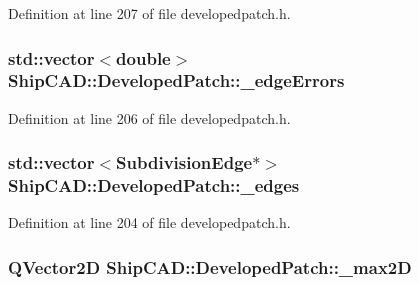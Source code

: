 Definition at line 207 of file developedpatch.\+h.

\subsubsection[{\texorpdfstring{\+\_\+edge\+Errors}{_edgeErrors}}]{\setlength{\rightskip}{0pt plus 5cm}std\+::vector$<$double$>$ Ship\+C\+A\+D\+::\+Developed\+Patch\+::\+\_\+edge\+Errors\hspace{0.3cm}{\ttfamily [protected]}}\hypertarget{classShipCAD_1_1DevelopedPatch_a997ac5cd92f3479d976f79a4da064d42}{}\label{classShipCAD_1_1DevelopedPatch_a997ac5cd92f3479d976f79a4da064d42}


Definition at line 206 of file developedpatch.\+h.

\subsubsection[{\texorpdfstring{\+\_\+edges}{_edges}}]{\setlength{\rightskip}{0pt plus 5cm}std\+::vector$<${\bf Subdivision\+Edge}$\ast$$>$ Ship\+C\+A\+D\+::\+Developed\+Patch\+::\+\_\+edges\hspace{0.3cm}{\ttfamily [protected]}}\hypertarget{classShipCAD_1_1DevelopedPatch_a2c7e5cadc05bcf6a66992d7269a9971e}{}\label{classShipCAD_1_1DevelopedPatch_a2c7e5cadc05bcf6a66992d7269a9971e}


Definition at line 204 of file developedpatch.\+h.

\subsubsection[{\texorpdfstring{\+\_\+max2D}{_max2D}}]{\setlength{\rightskip}{0pt plus 5cm}Q\+Vector2D Ship\+C\+A\+D\+::\+Developed\+Patch\+::\+\_\+max2D\hspace{0.3cm}{\ttfamily [protected]}}\hypertarget{classShipCAD_1_1DevelopedPatch_a2d4528866ab65f5e92a808c21134003e}{}\label{classShipCAD_1_1DevelopedPatch_a2d4528866ab65f5e92a808c21134003e}



